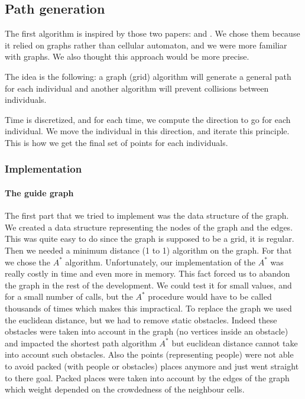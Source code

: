 \subsection{Path generation}

The first algorithm is inspired by those two papers: \cite{PLE} and
\cite{vandenBerg2011}. We chose them because it relied on graphs
rather than cellular automaton, and we were more familiar with
graphs. We also thought this approach would be more precise.


The idea is the following: a graph (grid) algorithm will generate a
general path for each individual and another algorithm will prevent
collisions between individuals.


Time is discretized, and for each time, we compute the direction to go
for each individual. We move the individual in this direction, and
iterate this principle. This is how we get the final set of points for
each individuals.


\subsubsection{Implementation}


\paragraph{The guide graph}

The first part that we tried to implement was the data structure of
the graph. We created a data structure representing the nodes of the
graph and the edges. This was quite easy to do since the graph is
supposed to be a grid, it is regular.  Then we needed a minimum
distance (1 to 1) algorithm on the graph. For that we chose the $A^*$
algorithm. Unfortunately, our implementation of the $A^*$ was really
costly in time and even more in memory. This fact forced us to abandon
the graph in the rest of the development. We could test it for small
values, and for a small number of calls, but the $A^*$ procedure would
have to be called thousands of times which makes this impractical.  To
replace the graph we used the euclidean distance, but we had to remove
static obstacles. Indeed these obstacles were taken into account in
the graph (no vertices inside an obstacle) and impacted the shortest
path algorithm $A^*$ but euclidean distance cannot take into account
such obstacles.  Also the points (representing people) were not able
to avoid packed (with people or obstacles) places anymore and just
went straight to there goal. Packed places were taken into account by
the edges of the graph which weight depended on the crowdedness of the
neighbour cells.

